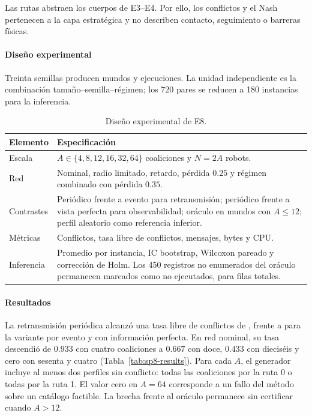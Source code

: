 Las rutas abstraen los cuerpos de E3--E4. Por ello, los conflictos y el Nash pertenecen a la capa estratégica y no describen contacto, seguimiento o barreras físicas.

\paragraph{Diseño experimental}

Treinta semillas producen \SPEightWorlds{} mundos y \SPEightExecutedRuns{} ejecuciones. La unidad independiente es la combinación tamaño--semilla--régimen; los 720 pares se reducen a 180 instancias para la inferencia.

\begin{table}[!htbp]
  \centering
  \caption{Diseño experimental de E8.}
  \label{tab:sp8-design}
  \viutablefont
  \begin{tabularx}{0.94\textwidth}{>{\raggedright\arraybackslash}p{2.4cm} Y}
    \toprule
    Elemento & Especificación \\
    \midrule
    Escala & $A\in\{4,8,12,16,32,64\}$ coaliciones y $N=2A$ robots. \\
    Red & Nominal, radio limitado, retardo, pérdida $0.25$ y régimen combinado con pérdida $0.35$. \\
    Contrastes & Periódico frente a evento para retransmisión; periódico frente a vista perfecta para observabilidad; oráculo en \SPEightCertified{} mundos con $A\leq12$; perfil aleatorio como referencia inferior. \\
    Métricas & Conflictos, tasa libre de conflictos, mensajes, bytes y CPU. \\
    Inferencia & Promedio por instancia, IC \mbox{bootstrap}, Wilcoxon pareado y corrección de Holm. Los 450 registros no enumerados del oráculo permanecen marcados como no ejecutados, para \SPEightRecords{} filas totales. \\
    \bottomrule
  \end{tabularx}
\end{table}

\paragraph{Resultados}

La retransmisión periódica alcanzó una tasa libre de conflictos de \SPEightProposedSuccess{}, frente a \SPEightNaiveSuccess{} para la variante por evento y \SPEightPerfectSuccess{} con información perfecta. En red nominal, su tasa descendió de $0.933$ con cuatro coaliciones a $0.667$ con doce, $0.433$ con dieciséis y cero con sesenta y cuatro (Tabla~\ref{tab:sp8-results}).
Para cada $A$, el generador incluye al menos dos perfiles sin conflicto: todas las coaliciones por la ruta 0 o todas por la ruta 1. El valor cero en $A=64$ corresponde a un fallo del método sobre un catálogo factible. La brecha frente al oráculo permanece sin certificar cuando $A>12$.

